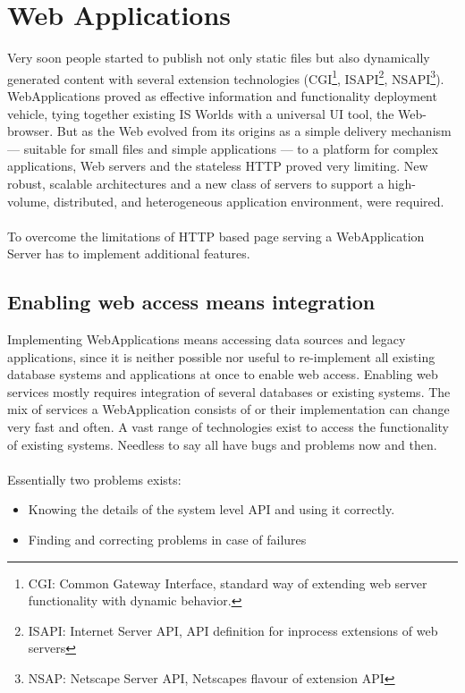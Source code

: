 \section{Web Applications}
Very soon people started to publish not only static files but also dynamically
generated content with several extension technologies (CGI\footnote{CGI: Common
Gateway Interface, standard way of extending web server functionality with
dynamic behavior.}, ISAPI\footnote{ISAPI: Internet Server API, API definition
for inprocess extensions of web servers}, NSAPI\footnote{NSAP: Netscape Server
API, Netscapes flavour of extension API}). WebApplications proved as effective
information and functionality deployment vehicle, tying together existing IS
Worlds with a universal UI tool, the Web-browser. But as the Web evolved from
its origins as a simple delivery mechanism — suitable for small files and simple
applications — to a platform for complex applications, Web servers and the
stateless HTTP proved very limiting. New robust, scalable architectures and a
new class of servers to support a high-volume, distributed, and heterogeneous
application environment, were required.\\
\\
To overcome the limitations of HTTP based page serving a WebApplication Server
has to implement additional features.

\subsection{Enabling web access means integration}
Implementing WebApplications means accessing data sources and legacy
applications, since it is neither possible nor useful to re-implement all
existing database systems and applications at once to enable web access.
Enabling web services mostly requires integration of several databases or
existing systems. The mix of services a WebApplication consists of or their
implementation can change very fast and often. A vast range of technologies
exist to access the functionality of existing systems. Needless to say all have
bugs and problems now and then.\\
\\
Essentially two problems exists:

\begin{itemize}
  \item Knowing the details of the system level API and using it correctly.
  \item Finding and correcting problems in case of failures
\end{itemize}

